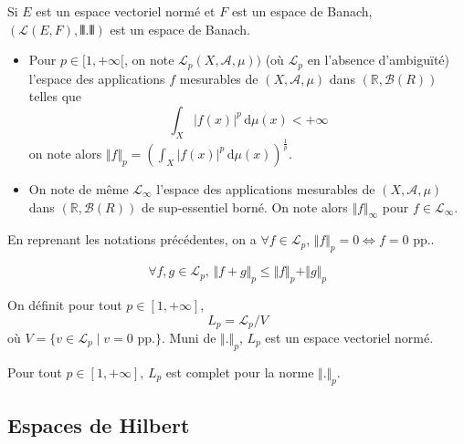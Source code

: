   \begin{example}
    Si $E$ est un espace vectoriel normé et $F$ est un espace de Banach, $(\mathcal{L}(E, F), \VERT . \VERT)$ est un espace de Banach.
  \end{example}


  \begin{definition}
    \begin{itemize}
      \item Pour $p \in [1, +\infty[$, on note $\mathcal{L}_p(X, \mathcal{A}, \mu))$ (où $\mathcal{L}_p$ en l'absence d'ambiguïté) l'espace des applications $f$ mesurables de $(X, \mathcal{A}, \mu)$ dans $(\mathbb{R}, \mathcal{B}(R))$ telles que
      \[ \int_X \vert f(x) \vert^p \, \mathrm{d}\mu(x) < +\infty \]
      on note alors $\Vert f \Vert_p = \left(\int_X \vert f(x) \vert^p \, \mathrm{d}\mu(x)\right)^{\frac{1}{p}}$.
      \item On note de même $\mathcal{L}_\infty$ l'espace des applications mesurables de $(X, \mathcal{A}, \mu)$ dans $(\mathbb{R}, \mathcal{B}(R))$ de sup-essentiel borné. On note alors $\Vert f \Vert_\infty$ pour $f \in \mathcal{L}_\infty$.
    \end{itemize}
  \end{definition}

  \begin{remark}
    En reprenant les notations précédentes, on a $\forall f \in \mathcal{L}_p$, $\Vert f \Vert_p = 0 \iff f = 0 \text{ pp.}$.
  \end{remark}

  \begin{theorem}
    \[ \forall f, g \in \mathcal{L}_p, \, \Vert f + g \Vert_p \leq \Vert f \Vert_p + \Vert g \Vert_p \]
  \end{theorem}

  \begin{theorem}
    On définit pour tout $p \in [1, +\infty]$,
    \[ L_p = \mathcal{L}_p / V \]
    où $V = \{ v \in \mathcal{L}_p \mid v = 0 \text{ pp.} \}$. Muni de $\Vert . \Vert_p$, $L_p$ est un espace vectoriel normé.
  \end{theorem}

  \begin{theorem}
    Pour tout $p \in [1, +\infty]$, $L_p$ est complet pour la norme $\Vert . \Vert_p$.
  \end{theorem}

  \subsection{Espaces de Hilbert}

